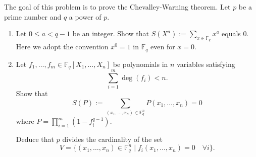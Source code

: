 \begin{exercise}
\label{algebra:2017:4}
The goal of this problem is to prove the Chevalley-Warning theorem. Let $p$ be a prime number and $q$ a power of $p$.

\begin{enumerate}
\item Let $0 \leq a < q - 1$ be an integer. Show that $S(X^a) := \sum_{x \in \mathbb{F}_q} x^a$ equals 0. Here we adopt the convention $x^0 = 1$ in $\mathbb{F}_q$ even for $x = 0$.

\item Let $f_1, \ldots, f_m \in \mathbb{F}_q[X_1, \ldots, X_n]$ be polynomials in $n$ variables satisfying
\[\sum_{i=1}^m \deg(f_i) < n.\]
Show that
\[S(P) := \sum_{(x_1,\ldots,x_n) \in \mathbb{F}_q^n} P(x_1,\ldots,x_n) = 0\]
where $P = \prod_{i=1}^m (1 - f_i^{q-1})$.

Deduce that $p$ divides the cardinality of the set
\[V = \{(x_1, \ldots, x_n) \in \mathbb{F}_q^n \mid f_i(x_1, \ldots, x_n) = 0 \quad \forall i\}.\]
\end{enumerate}
\end{exercise}
